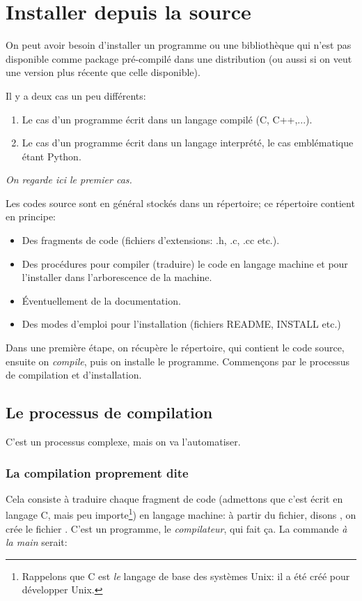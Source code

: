 


\section{Installer depuis la \og source \fg}
On peut avoir besoin d'installer un programme ou une bibliothèque qui
n'est pas disponible comme package pré-compilé dans une distribution
(ou aussi si on veut une version plus récente que celle disponible).

Il y a deux cas un peu différents:
\begin{enumerate}
  \item Le cas d'un programme écrit dans un langage compilé (C,
    C++,...).
  \item Le cas d'un programme écrit dans un langage interprété, le cas
    emblématique étant Python.
\end{enumerate}

\emph{On regarde ici le premier cas.}

Les codes source sont en général stockés dans un répertoire; ce
répertoire contient en principe:
\begin{itemize}
  \item Des fragments de code (fichiers d'extensions: .h, .c, .cc
    etc.).
  \item Des procédures pour compiler (traduire) le code en langage
    machine et pour l'installer dans l'arborescence de la machine.
  \item Éventuellement de la documentation.
  \item Des modes d'emploi pour l'installation (fichiers README,
    INSTALL etc.)
\end{itemize}

Dans une première étape, on récupère le répertoire, qui
contient le code source, ensuite on \emph{compile}, puis on installe
le programme. Commençons par le processus de compilation et d'installation.

\subsection{Le processus de compilation}
C'est un processus complexe, mais on va l'automatiser.
\subsubsection{La compilation proprement dite}
Cela consiste à traduire chaque fragment de code (admettons que c'est
écrit en langage C, mais peu importe\footnote{Rappelons que C est
  \emph{le} langage de base des systèmes Unix: il a été créé pour
  développer Unix.}) en langage machine: à partir
du fichier, disons , on crée le fichier
. C'est un programme, le \emph{compilateur}, qui fait ça. La
commande \textsl{à la main} serait:


